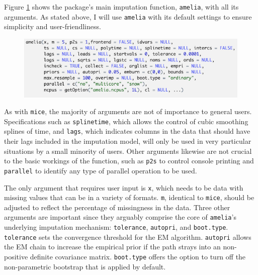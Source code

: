 \documentclass[12pt,econ]{sources/authesis}
\makeatletter
\def\maxwidth{\ifdim\Gin@nat@width>\linewidth\linewidth
\else\Gin@nat@width\fi}
\let\Oldincludegraphics\includegraphics
\renewcommand{\includegraphics}[1]{\Oldincludegraphics[width=\maxwidth]{#1}}
\def\caption{\refstepcounter\@captype \@dblarg{\@caption\@captype}}
\makeatother
\begin{document}
Figure \ref{amelia-func} shows the package's main imputation function, \texttt{amelia}, with all its arguments. As stated above, I will use \texttt{amelia} with its default settings to ensure simplicity and user-friendliness.

\vspace{0.5cm}
\begin{figure}[!htbp] 
  \centering
  \includegraphics{figures/amelia.png}
  \caption{The \texttt{amelia} Function}
  \label{amelia-func}
\end{figure}
\vspace{-0.5cm}

As with \texttt{mice}, the majority of arguments are not of importance to general users. Specifications such as \texttt{splinetime}, which allows the control of cubic smoothing splines of time, and \texttt{lags}, which indicates columns in the data that should have their lags included in the imputation model, will only be used in very particular situations by a small minority of users. Other arguments likewise are not crucial to the basic workings of the function, such as \texttt{p2s} to control console printing and \texttt{parallel} to identify any type of parallel operation to be used.

The only argument that requires user input is \texttt{x}, which needs to be data with missing values that can be in a variety of formats. \texttt{m}, identical to \texttt{mice}, should be adjusted to reflect the percentage of missingness in the data. Three other arguments are important since they arguably comprise the core of \texttt{amelia}'s underlying imputation mechanism: \texttt{tolerance}, \texttt{autopri}, and \texttt{boot.type}. \texttt{tolerance} sets the convergence threshold for the EM algorithm. \texttt{autopri} allows the EM chain to increase the empirical prior if the path strays into an non-positive definite covariance matrix. \texttt{boot.type} offers the option to turn off the non-parametric bootstrap that is applied by default.
\end{document}

